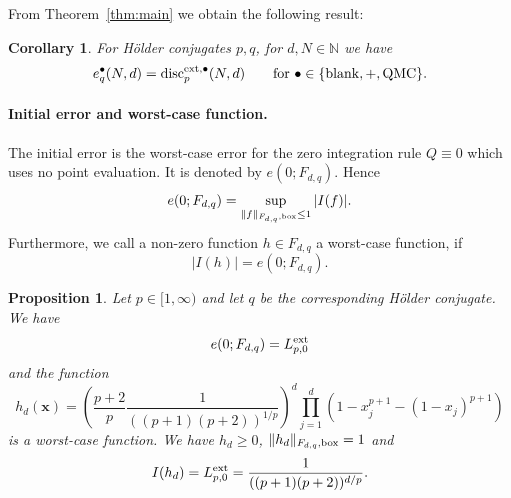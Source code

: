 \documentclass[12pt]{article}
\newtheorem{prop}[thm]{Proposition}
\newtheorem{cor}{Corollary}
\theoremstyle{remark}
\theoremstyle{definition}
\newcommand{\N}{\mathbb{N}}
\newcommand{\ex}{{\rm ext}}
\newcommand{\bx}{{\rm box}}
\newcommand{\qmc}{{\rm QMC}}
\newcommand{\bsx}{{\boldsymbol x}}
\newcommand{\<}{\langle}
\renewcommand{\>}{\rangle}
\begin{document}
From Theorem~\ref{thm:main} we obtain the following result:

\begin{cor}\label{cor1}
For H\"older conjugates $p,q$, for $d,N \in \N$ we have $$e_q^{\bullet}(N,d)={\rm disc}_p^{\ex,\bullet}(N,d) \qquad \mbox{for } \bullet \in \{{\rm blank},+,\qmc\}.$$
\end{cor}



\paragraph{Initial error and worst-case function.} The initial error is the worst-case error for the zero integration rule $Q\equiv 0$ which uses no point evaluation. It is denoted by $e(0;F_{d,q})$. Hence $$e(0;F_{d,q}) =\sup_{\|f\|_{F_{d,q},\bx} \le 1} |I(f)|.$$ 
Furthermore, we call a non-zero function $h \in F_{d,q}$ a worst-case function, if $$|I(h)|=  e(0;F_{d,q}).$$


\begin{prop}\label{pr:wc:fct}
Let $p \in [1,\infty)$ and let $q$ be the corresponding H\"older conjugate. We have $$e(0;F_{d,q})=L_{p,0}^{\ex}$$ and the function
$$h_d(\bsx)=\left(\frac{p+2}{p} \frac{1}{((p+1)(p+2))^{1/p}}\right)^d \prod_{j=1}^d \left(1-x_j^{p+1}-(1-x_j)^{p+1}\right)$$ is a worst-case function. We have $h_d \ge 0$, $\|h_d\|_{F_{d,q},\bx}=1$ and $$I(h_d) = L_{p,0}^{\ex}=\frac{1}{((p+1)(p+2))^{d/p}}.$$
\end{prop}
\end{document}
